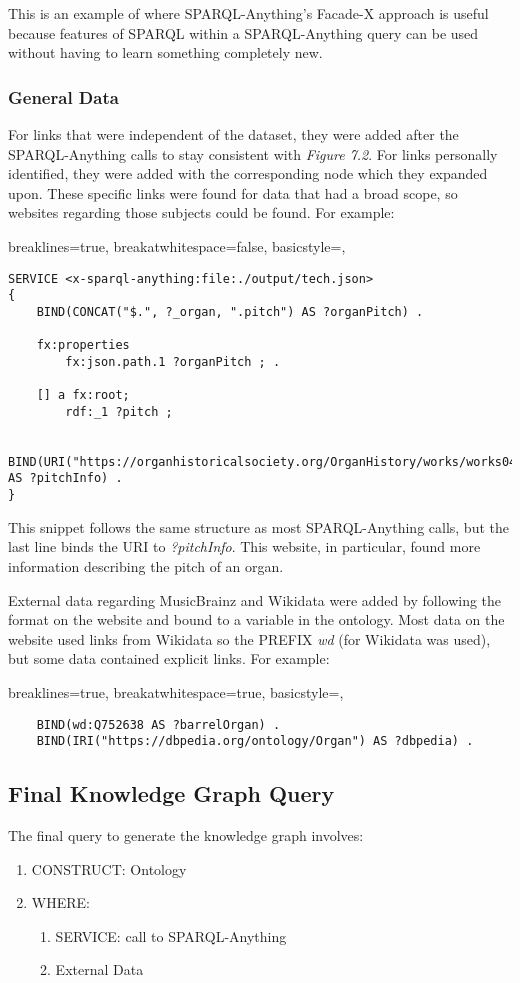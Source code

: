 This is an example of where SPARQL-Anything's Facade-X approach is useful because  features of SPARQL within a SPARQL-Anything query can be used without having to learn something completely new. 

\subsubsection{General Data}
\hspace*{0.5cm} For links that were independent of the dataset, they were added after the SPARQL-Anything calls to stay consistent with \textit{Figure 7.2}. For links personally identified, they were added with the corresponding node which they expanded upon. These specific links were found for data that had a broad scope, so websites regarding those subjects could be found. For example:

\lstset
{
    breaklines=true,
    breakatwhitespace=false,
    basicstyle=\ttfamily,
}
\begin{lstlisting}
SERVICE <x-sparql-anything:file:./output/tech.json>
{
    BIND(CONCAT("$.", ?_organ, ".pitch") AS ?organPitch) .

    fx:properties
        fx:json.path.1 ?organPitch ; .

    [] a fx:root; 
        rdf:_1 ?pitch ;
    
    BIND(URI("https://organhistoricalsociety.org/OrganHistory/works/works04.htm") AS ?pitchInfo) .
} 
\end{lstlisting}

This snippet follows the same structure as most SPARQL-Anything calls, but the last line binds the URI to \textit{?pitchInfo}. This website, in particular, found more information describing the pitch of an organ. 

External data regarding MusicBrainz and Wikidata were added by following the format on the website and bound to a variable in the ontology. Most data on the website used links from Wikidata so the PREFIX \textit{wd} (for Wikidata was used), but some data contained explicit links. For example:

\lstset
{
    breaklines=true,
    breakatwhitespace=true,
    basicstyle=\ttfamily,
}
\begin{lstlisting}
    BIND(wd:Q752638 AS ?barrelOrgan) . 
    BIND(IRI("https://dbpedia.org/ontology/Organ") AS ?dbpedia) .
\end{lstlisting}

\subsection{Final Knowledge Graph Query}
\hspace*{0.5cm} The final query to generate the knowledge graph involves: 

\begin{enumerate}
    \item CONSTRUCT: Ontology
    \item WHERE:
    \begin{enumerate}
        \vspace{-0.25cm}
        \item SERVICE: call to SPARQL-Anything
        \item External Data
    \end{enumerate}
\end{enumerate}
